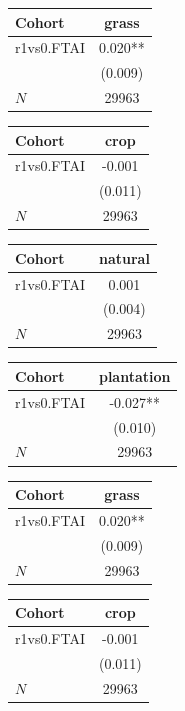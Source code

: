 {
\def\sym#1{\ifmmode^{#1}\else\(^{#1}\)\fi}
\begin{tabular}{l*{1}{c}}
\toprule
Cohort    &    grass   \\
\midrule
r1vs0.FTAI&    0.020** \\
          &  (0.009)   \\
\midrule
\(N\)     &    29963   \\
\bottomrule
\end{tabular}
}
{
\def\sym#1{\ifmmode^{#1}\else\(^{#1}\)\fi}
\begin{tabular}{l*{1}{c}}
\toprule
Cohort    &     crop   \\
\midrule
r1vs0.FTAI&   -0.001   \\
          &  (0.011)   \\
\midrule
\(N\)     &    29963   \\
\bottomrule
\end{tabular}
}
{
\def\sym#1{\ifmmode^{#1}\else\(^{#1}\)\fi}
\begin{tabular}{l*{1}{c}}
\toprule
Cohort    &  natural   \\
\midrule
r1vs0.FTAI&    0.001   \\
          &  (0.004)   \\
\midrule
\(N\)     &    29963   \\
\bottomrule
\end{tabular}
}
{
\def\sym#1{\ifmmode^{#1}\else\(^{#1}\)\fi}
\begin{tabular}{l*{1}{c}}
\toprule
Cohort    &plantation   \\
\midrule
r1vs0.FTAI&   -0.027** \\
          &  (0.010)   \\
\midrule
\(N\)     &    29963   \\
\bottomrule
\end{tabular}
}
{
\def\sym#1{\ifmmode^{#1}\else\(^{#1}\)\fi}
\begin{tabular}{l*{1}{c}}
\toprule
Cohort    &    grass   \\
\midrule
r1vs0.FTAI&    0.020** \\
          &  (0.009)   \\
\midrule
\(N\)     &    29963   \\
\bottomrule
\end{tabular}
}
{
\def\sym#1{\ifmmode^{#1}\else\(^{#1}\)\fi}
\begin{tabular}{l*{1}{c}}
\toprule
Cohort    &     crop   \\
\midrule
r1vs0.FTAI&   -0.001   \\
          &  (0.011)   \\
\midrule
\(N\)     &    29963   \\
\bottomrule
\end{tabular}
}
